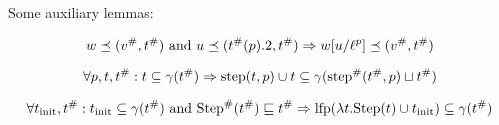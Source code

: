Some auxiliary lemmas:
\begin{lem}
  \[w\preceq({v}^{\#},{t}^{\#})\text{ and }u\preceq({t}^{\#}(p).2,{t}^{\#})\Rightarrow w[u/{\ell}^{p}]\preceq({v}^{\#},{t}^{\#})\]
\end{lem}
\begin{lem}
  \[\forall p,t,{t}^{\#}:t\subseteq\gamma({t}^{\#})\Rightarrow\text{step}(t,p)\cup t\subseteq\gamma({\text{step}}^{\#}({t}^{\#},p)\sqcup{t}^{\#})\]
\end{lem}
\begin{lem}
  \[\forall t_{\text{init}},{t}^{\#}:t_{\text{init}}\subseteq\gamma({t}^{\#})\text{ and }{\text{Step}}^{\#}({t}^{\#})\sqsubseteq{t}^{\#}\Rightarrow\text{lfp}(\lambda t.\text{Step}(t)\cup t_{\text{init}})\subseteq\gamma({t}^{\#})\]
\end{lem}
